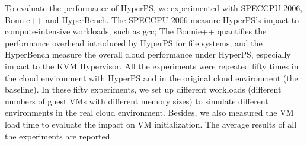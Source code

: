 To evaluate the performance of HyperPS, we experimented with SPECCPU 2006, Bonnie++ and HyperBench. The SPECCPU 2006 measure HyperPS's impact to compute-intensive workloads, such as gcc; The Bonnie++ quantifies the performance overhead introduced by HyperPS for file systems; and the HyperBench measure the overall cloud performance under HyperPS, especially impact to the KVM Hypervisor.
All the experiments were repeated fifty times in the cloud environment with HyperPS and in the original cloud environment (the baseline).
In these fifty experiments, we set up different workloads (different numbers of guest VMs with different memory sizes) to simulate different environments in the real cloud environment. 
Besides, we also measured the VM load time to evaluate the impact on VM initialization.
The average results of all the experiments are reported. 






